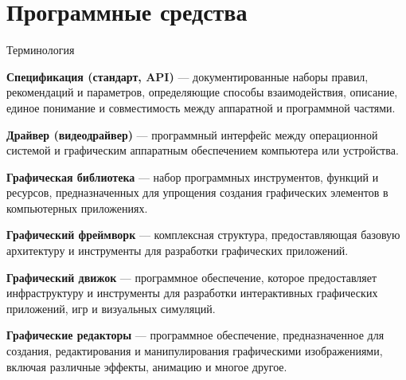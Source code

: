 \documentclass{beamer}
\begin{document}
\section{Программные средства}
\begin{frame}{Терминология}

	{\scriptsize

		\textbf{Спецификация (стандарт, API)} --- документированные наборы правил, рекомендаций и параметров, определяющие способы взаимодействия, описание, единое понимание и совместимость между аппаратной и программной частями.

		\textbf{Драйвер (видеодрайвер)} --- программный интерфейс между операционной системой и графическим аппаратным обеспечением компьютера или устройства.

		\textbf{Графическая библиотека} --- набор программных инструментов, функций и ресурсов, предназначенных для упрощения создания графических элементов в компьютерных приложениях.

		\textbf{Графический фреймворк} --- комплексная структура, предоставляющая базовую архитектуру и инструменты для разработки графических приложений.

		\textbf{Графический движок} --- программное обеспечение, которое предоставляет инфраструктуру и инструменты для разработки интерактивных графических приложений, игр и визуальных симуляций.

		\textbf{Графические редакторы} --- программное обеспечение, предназначенное для создания, редактирования и манипулирования графическими изображениями, включая различные эффекты, анимацию и многое другое.

}
\end{frame}
\end{document}
